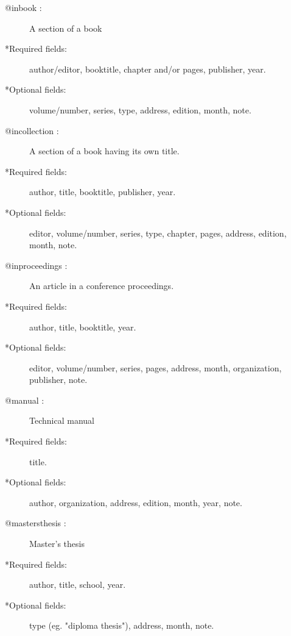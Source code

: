 \begin{description}
\item[@inbook :] A section of a book
\item[*Required fields:] author/editor, booktitle, chapter and/or pages, publisher, year.
\item[*Optional fields:] volume/number, series, type, address, edition, month, note.
\item[@incollection :] A section of a book having its own title.
\item[*Required fields:] author, title, booktitle, publisher, year.
\item[*Optional fields:] editor, volume/number, series, type, chapter, pages, address, edition, month, note.
\item[@inproceedings :] An article in a conference proceedings.
\item[*Required fields:] author, title, booktitle, year.
\item[*Optional fields:] editor, volume/number, series, pages, address, month, organization, publisher, note.
\item[@manual :] Technical manual
\item[*Required fields:] title.
\item[*Optional fields:] author, organization, address, edition, month, year, note.
\item[@mastersthesis :] Master's thesis
\item[*Required fields:] author, title, school, year.
\item[*Optional fields:] type (eg. "diploma thesis"), address, month, note.
\end{description}

